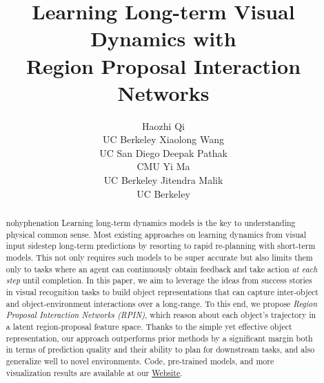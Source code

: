 \documentclass{article} \usepackage{iclr2021_conference,times}
\title{Learning Long-term Visual Dynamics with \\ Region Proposal Interaction Networks}
\author{Haozhi Qi \\
  \hspace{-0.4em}UC Berkeley
  \And
  Xiaolong Wang\\
  \hspace{0.35em}UC San Diego
  \And
  Deepak Pathak \\
  \hspace{2.25em}CMU
  \And
  \hspace{1.2em}Yi Ma \\
  UC Berkeley
  \And
  Jitendra Malik \\
  \hspace{0.6em}UC Berkeley
}
\begin{document}
\maketitle

\vspace{-1.0em}
\begin{abstract}
\begin{hyphenrules}{nohyphenation}
\vspace{-0.5em}
Learning long-term dynamics models is the key to understanding physical common sense.
Most existing approaches on learning dynamics from visual input sidestep long-term predictions by resorting to rapid re-planning with short-term models. This not only requires such models to be super accurate but also limits them only to tasks where an agent can continuously obtain feedback and take action \textit{at each step} until completion.
In this paper, we aim to leverage the ideas from success stories in visual recognition tasks to build object representations that can capture inter-object and object-environment interactions over a long-range.
To this end, we propose \textit{Region Proposal Interaction Networks (RPIN)}, which reason about each object's trajectory in a latent region-proposal feature space.
Thanks to the simple yet effective object representation, our approach outperforms prior methods by a significant margin both in terms of prediction quality and their ability to plan for downstream tasks, and also generalize well to novel environments. Code, pre-trained models, and more visualization results are available at our \href{https://haozhiqi.github.io/RPIN}{Website}.
\end{hyphenrules}
\end{abstract}

\vspace{-1.0em}
\end{document}
